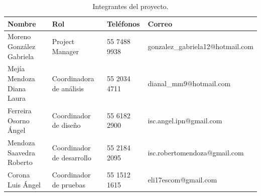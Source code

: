 \begin{table}[hbtp!]
    \noindent\begin{tabular}{|p{}|p{}|p{}|p{}|}
    	\hline
    	{\bf Nombre} & {\bf Rol} & {\bf Teléfonos} & {\bf Correo}\\
    	\hline
	Moreno González Gabriela & Project Manager & 55 7488 9938 & gonzalez\_gabriela12@hotmail.com \\
        	\hline
    	Mejía Mendoza Diana Laura & Coordinadora de análisis & 55 2034 4711 & dianal\_mm9@hotmail.com \\
    	\hline
	Ferreira Osorno Ángel & Coordinador de diseño & 55 6182 2900 & isc.angel.ipn@gmail.com \\
	\hline
	Mendoza Saavedra Roberto & Coordinador de desarrollo & 55 2184 2095 & isc.robertomendoza@gmail.com \\
	\hline
	Corona Luis Ángel & Coordinador de pruebas & 55 1512 1615 & eli17escom@gmail.com \\
    \end{tabular}
	\caption{Integrantes del proyecto.}
	\label{tbl:staff}
\end{table}

